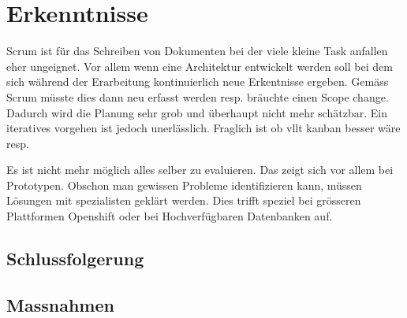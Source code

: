 \chapter{Erkenntnisse}

Scrum ist für das Schreiben von Dokumenten bei der viele kleine Task anfallen eher ungeignet. Vor allem wenn eine Architektur entwickelt werden soll bei dem sich während der Erarbeitung kontinuierlich
neue Erkentnisse ergeben. Gemäss Scrum müsste dies dann neu erfasst werden resp. bräuchte einen Scope change. Dadurch wird die Planung sehr grob und überhaupt nicht mehr schätzbar. Ein iteratives vorgehen ist jedoch unerlässlich. Fraglich ist ob vllt kanban besser wäre resp.

Es ist nicht mehr möglich alles selber zu evaluieren. Das zeigt sich vor allem bei Prototypen. Obschon man gewissen Probleme identifizieren kann, müssen Lösungen mit spezialisten geklärt werden. Dies trifft speziel bei grösseren Plattformen Openshift oder bei Hochverfügbaren Datenbanken auf. 

\section{Schlussfolgerung}

\section{Massnahmen}